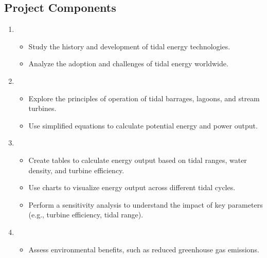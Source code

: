 \documentclass[letterpaper,10pt,english]{jupyterBook}
\begin{document}
\subsection{Project Components}
\label{\detokenize{ProjectSyllabus:id14}}\begin{enumerate}
%
\item {} 
\sphinxAtStartPar
{}
\begin{itemize}
\item {} 
\sphinxAtStartPar
Study the history and development of tidal energy technologies.

\item {} 
\sphinxAtStartPar
Analyze the adoption and challenges of tidal energy worldwide.

\end{itemize}

\item {} 
\sphinxAtStartPar
{}
\begin{itemize}
\item {} 
\sphinxAtStartPar
Explore the principles of operation of tidal barrages, lagoons,
and stream turbines.

\item {} 
\sphinxAtStartPar
Use simplified equations to calculate potential energy and power
output.

\end{itemize}

\item {} 
\sphinxAtStartPar
{}
\begin{itemize}
\item {} 
\sphinxAtStartPar
Create tables to calculate energy output based on tidal ranges,
water density, and turbine efficiency.

\item {} 
\sphinxAtStartPar
Use charts to visualize energy output across different tidal
cycles.

\item {} 
\sphinxAtStartPar
Perform a sensitivity analysis to understand the impact of key
parameters (e.g., turbine efficiency, tidal range).

\end{itemize}

\item {} 
\sphinxAtStartPar
{}
\begin{itemize}
\item {} 
\sphinxAtStartPar
Assess environmental benefits, such as reduced greenhouse gas
emissions.


\end{itemize}
\end{enumerate}
\end{document}
